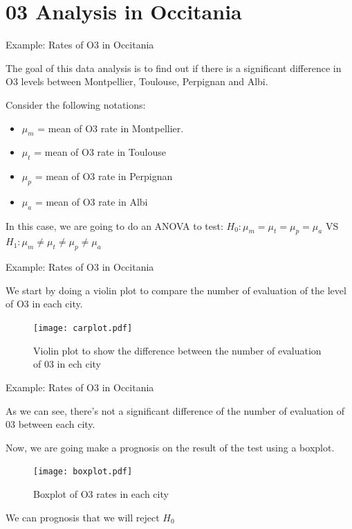 \documentclass[unknownkeysallowed]{beamer}
\begin{document}
\section{03 Analysis in Occitania}
\begin{frame}{Example: Rates of O3 in Occitania}
	
	The goal of this data analysis is to find out if there is a significant difference in O3 levels between Montpellier, Toulouse, Perpignan and Albi. 
	
	\vspace{0.2cm}
	
	Consider the following notations:
	\begin{itemize}
		\item{$\mu_m$ = mean of O3 rate in Montpellier.}
		\item{$\mu_t$ = mean of O3 rate in Toulouse}
		\item{$\mu_p$ = mean of O3 rate in Perpignan}
		\item{$\mu_a$ = mean of O3 rate in Albi}
	\end{itemize}
	
	\vspace{0.2cm}
	
	In this case, we are going to do an ANOVA to test:
	$H_0:\mu_m=\mu_t=\mu_p=\mu_a$ VS $H_1:\mu_m \neq \mu_t \neq \mu_p \neq \mu_a$
\end{frame}

\begin{frame}{Example: Rates of O3 in Occitania}
	
	We start by doing a violin plot to compare the number of evaluation of the level of O3 in each city. 
	\begin{figure}
		\centering
		\texttt{[image: carplot.pdf]}
		\caption{Violin plot to show the difference between the number of evaluation of 03 in ech city}
		\label{fig:my_label}
	\end{figure}
\end{frame}

\begin{frame}{Example: Rates of O3 in Occitania}
	
	As we can see, there's not a significant difference of the number of evaluation of 03 between each city.
	
	Now, we are going make a prognosis on the result of the test using a boxplot.
	
	\begin{figure}
		\centering
		\texttt{[image: boxplot.pdf]}
		\caption{ Boxplot of O3 rates in each city}
		\label{fig:my_label}
	\end{figure}
	
	We can prognosis that we will reject $H_0$   
\end{frame}
\end{document}
